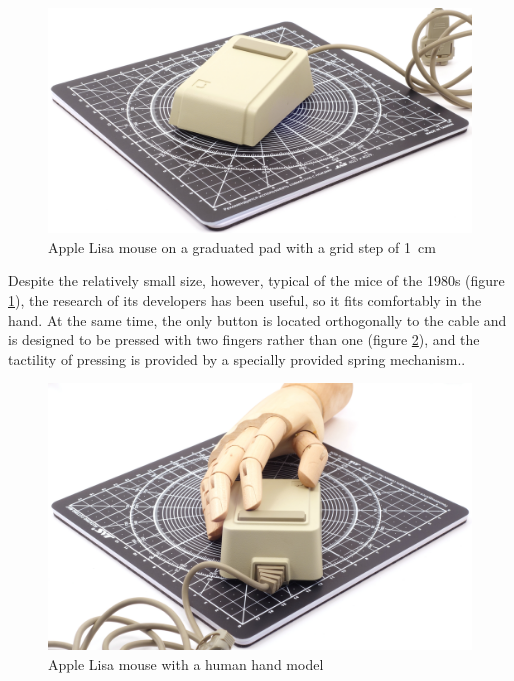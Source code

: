 \documentclass[11pt, a4paper]{article}
\begin{document}
\begin{figure}[h]
    \centering
    \includegraphics[scale=0.4]{1983_apple_lisa_mouse/applekovrik_60.jpg}
    \caption{Apple Lisa mouse on a graduated pad with a grid step of 1~cm}
    \label{fig:AppleLisaSize}
\end{figure}

Despite the relatively small size, however, typical of the mice of the 1980s (figure \ref{fig:AppleLisaSize}), the research of its developers has been useful, so it fits comfortably in the hand. At the same time, the only button is located orthogonally to the cable and is designed to be pressed with two fingers rather than one (figure \ref{fig:AppleLisaHand}), and the tactility of pressing is provided by a specially provided spring mechanism..

\begin{figure}[h]
    \centering
    \includegraphics[scale=0.4]{1983_apple_lisa_mouse/appleruka_60.jpg}
    \caption{Apple Lisa mouse with a human hand model}
    \label{fig:AppleLisaHand}
\end{figure}
\end{document}
